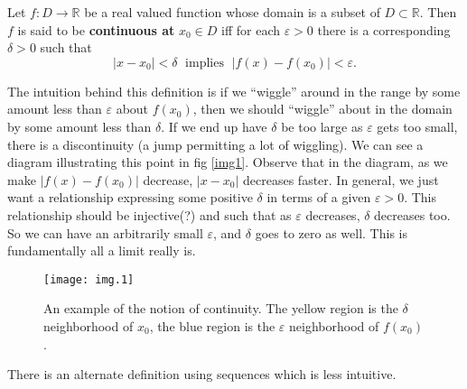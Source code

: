 

\begin{defn} 
Let $f:D\to\mathbb{R}$ be a real valued function whose domain is a subset of
$D\subset\mathbb{R}$. Then $f$ is said to be
\textbf{continuous at} 
$x_{0}\in D$ iff for each $\varepsilon>0$ there is a
corresponding $\delta>0$ such that
\begin{equation}
|x-x_0|<\delta\;\text{ implies }\;|f(x)-f(x_0)|<\varepsilon.
\end{equation}
\end{defn}
\begin{rmk}
The intuition behind this definition is if we ``wiggle'' around
in the range by some amount less than $\varepsilon$ about $f(x_0)$, then
we should ``wiggle'' about in the domain by some amount less than
$\delta$. If we end up have $\delta$ be too large as
$\varepsilon$ gets too small, there is a discontinuity (a jump
permitting a lot of wiggling). We can see a diagram illustrating
this point in fig \eqref{img1}. Observe that in the diagram, as
we make $|f(x)-f(x_{0})|$ decrease, $|x-x_{0}|$ decreases
faster. In general, we just want a relationship expressing some positive
$\delta$ in terms of a given $\varepsilon>0$. This relationship
should be injective(?) and such that as $\varepsilon$ decreases,
$\delta$ decreases too. So we can have an arbitrarily small
$\varepsilon$, and $\delta$ goes to zero as well. This is
fundamentally all a limit really is.
\end{rmk}
\begin{figure}
\texttt{[image: img.1]}
\caption{An example of the notion of continuity. The yellow
  region is the $\delta$ neighborhood of $x_{0}$, the blue region
  is the $\varepsilon$ neighborhood of $f(x_{0})$.}\label{img1}
\end{figure}

There is an alternate definition using sequences which is less
intuitive.

